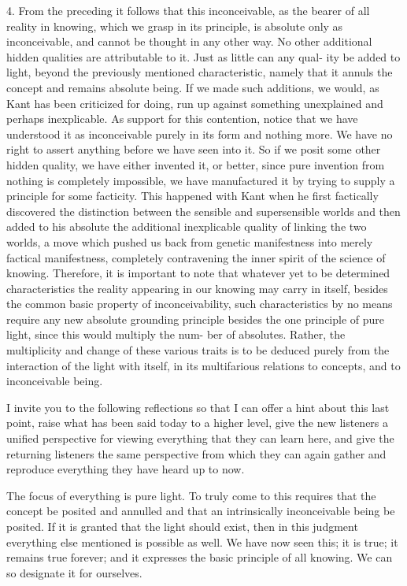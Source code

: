 4. From the preceding it follows that this inconceivable,
as the bearer of all reality in knowing,
which we grasp in its principle, is absolute only as inconceivable,
and cannot be thought in any other way.
No other additional hidden qualities are attributable to it.
Just as little can any qual-
ity be added to light, beyond the previously mentioned characteristic,
namely that it annuls the concept and remains absolute being.
If we made
such additions, we would, as Kant has been criticized for doing, run up
against something unexplained and perhaps inexplicable.
As support for
this contention, notice that we have understood it as inconceivable purely
in its form and nothing more.
We have no right to assert anything before
we have seen into it.
So if we posit some other hidden quality,
we have either invented it, or better,
since pure invention from nothing is completely impossible,
we have manufactured it by trying to supply a principle for some facticity.
This happened with Kant when he first factically discovered
the distinction between the sensible and supersensible worlds and
then added to his absolute the additional inexplicable quality of linking the
two worlds, a move which pushed us back from genetic manifestness into
merely factical manifestness, completely contravening the inner spirit of
the science of knowing.
Therefore, it is important to note that whatever yet
to be determined characteristics the reality appearing in our knowing may
carry in itself, besides the common basic property of inconceivability, such
characteristics by no means require any new absolute grounding principle
besides the one principle of pure light, since this would multiply the num-
ber of absolutes.
Rather, the multiplicity and change of these various traits is to be
deduced purely from the interaction of the light with itself,
in its multifarious relations to concepts, and to inconceivable being.

I invite you to the following reflections
so that I can offer a hint about this last point,
raise what has been said today to a higher level,
give the new listeners a unified perspective
for viewing everything that they can learn here,
and give the returning listeners the same perspective
from which they can again gather and reproduce
everything they have heard up to now.

The focus of everything is pure light.
To truly come to this requires that
the concept be posited and annulled
and that an intrinsically inconceivable being be posited.
If it is granted that the light should exist,
then in this judgment everything else mentioned is possible as well.
We have now seen this; it is true; it remains true forever;
and it expresses the basic principle of all knowing.
We can so designate it for ourselves.

